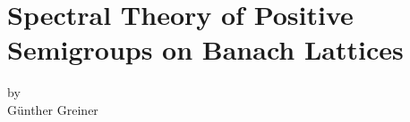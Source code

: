 
\chapter[Spectral Theory on Banach Lattices]{Spectral Theory of Positive Semigroups on Banach Lattices}\label{chap:c3}
%
{\Large
\vspace*{-.75cm}
by \\[.25em]
Günther Greiner
\vspace{.75cm}
\\
}
